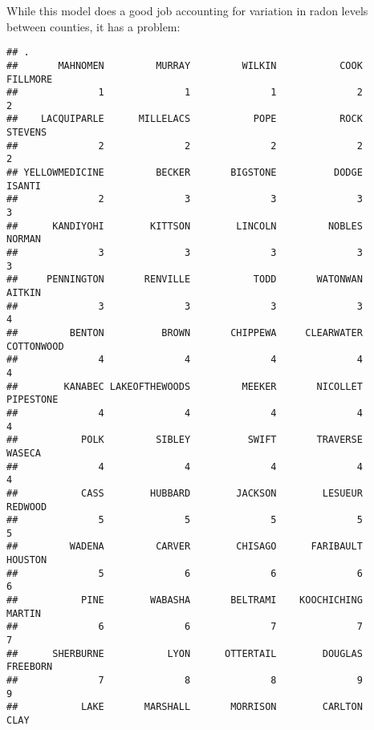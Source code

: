 \documentclass[
]{article}
\newenvironment{Shaded}{\begin{snugshade}}{\end{snugshade}}
\newcommand{\NormalTok}[1]{#1}
\newcommand{\SpecialCharTok}[1]{\textcolor[rgb]{0.00,0.00,0.00}{#1}}
\begin{document}
While this model does a good job accounting for variation in radon
levels between counties, it has a problem:

\begin{Shaded}
\end{Shaded}

\begin{verbatim}
## .
##       MAHNOMEN         MURRAY         WILKIN           COOK       FILLMORE 
##              1              1              1              2              2 
##    LACQUIPARLE      MILLELACS           POPE           ROCK        STEVENS 
##              2              2              2              2              2 
## YELLOWMEDICINE         BECKER       BIGSTONE          DODGE         ISANTI 
##              2              3              3              3              3 
##      KANDIYOHI        KITTSON        LINCOLN         NOBLES         NORMAN 
##              3              3              3              3              3 
##     PENNINGTON       RENVILLE           TODD       WATONWAN         AITKIN 
##              3              3              3              3              4 
##         BENTON          BROWN       CHIPPEWA     CLEARWATER     COTTONWOOD 
##              4              4              4              4              4 
##        KANABEC LAKEOFTHEWOODS         MEEKER       NICOLLET      PIPESTONE 
##              4              4              4              4              4 
##           POLK         SIBLEY          SWIFT       TRAVERSE         WASECA 
##              4              4              4              4              4 
##           CASS        HUBBARD        JACKSON        LESUEUR        REDWOOD 
##              5              5              5              5              5 
##         WADENA         CARVER        CHISAGO      FARIBAULT        HOUSTON 
##              5              6              6              6              6 
##           PINE        WABASHA       BELTRAMI    KOOCHICHING         MARTIN 
##              6              6              7              7              7 
##      SHERBURNE           LYON      OTTERTAIL        DOUGLAS       FREEBORN 
##              7              8              8              9              9 
##           LAKE       MARSHALL       MORRISON        CARLTON           CLAY 

\end{verbatim}
\end{document}
